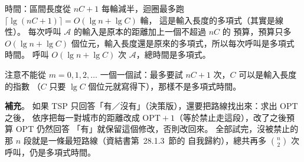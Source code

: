 \begin{pastsoln}
時間：區間長度從 $nC + 1$ 每輪減半，迴圈最多跑 $\lceil \lg(nC + 1) \rceil = O(\lg n + \lg C)$ 輪，
這是輸入長度的多項式（其實是線性）。 每次呼叫 $\mathcal{A}$ 的輸入是原本的距離加上一個不超過 $nC$ 的
預算，預算只多 $O(\lg n + \lg C)$ 個位元，輸入長度還是原來的多項式，所以每次呼叫是多項式時間。
呼叫 $O(\lg n + \lg C)$ 次 $\mathcal{A}$，總時間是多項式。

注意不能從 $m = 0, 1, 2, \ldots$ 一個一個試：最多要試 $nC + 1$ 次，$C$ 可以是輸入長度的指數
（$C$ 只要 $\lg C$ 個位元就寫得下），那樣不是多項式時間。

\textbf{補充}。 如果 TSP 只回答「有／沒有」（決策版），還要把路線找出來：求出 $\mathrm{OPT}$ 之後，
依序把每一對城市的距離改成 $\mathrm{OPT} + 1$（等於禁止走這段），改了之後預算 $\mathrm{OPT}$ 仍然回答
「有」就保留這個修改，否則改回來。 全部試完，沒被禁止的那 $n$ 段就是一條最短路線（資結書第~28.1.3~節的
自我歸約），總共再多 $\binom{n}{2}$ 次呼叫，仍是多項式時間。
\end{pastsoln}
